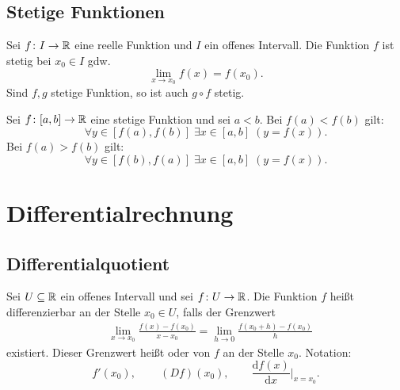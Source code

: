 \subsection{Stetige Funktionen}
Sei $f\colon I\to\mathbb R$ eine reelle Funktion und $I$ ein offenes
Intervall. Die Funktion $f$ ist stetig bei $x_0\in I$ gdw.
\begin{equation}
\lim_{x\to x_0} f(x)=f(x_0).
\end{equation}
Sind $f,g$ stetige Funktion, so ist auch $g\circ f$ stetig.

\noindent
{}
Sei $f\colon [a,b]\to\mathbb R$ eine stetige Funktion und sei
$a<b$. Bei $f(a)<f(b)$ gilt:
\begin{equation}
\forall y{\in}[f(a),f(b)]\;\exists x{\in}[a,b]\;(y=f(x)).
\end{equation}
Bei $f(a)>f(b)$ gilt:
\begin{equation}
\forall y{\in}[f(b),f(a)]\;\exists x{\in}[a,b]\;(y=f(x)).
\end{equation}

\newpage
\section{Differentialrechnung}
\subsection{Differentialquotient}
\begin{definition}[Differentialquotient]\mbox{}\newline
Sei $U\subseteq\mathbb R$ ein offenes Intervall
und sei $f\colon U\to\mathbb R$. Die Funktion $f$ heißt
differenzierbar
an der Stelle $x_0\in U$, falls der Grenzwert
\begin{equation}
\begin{split}
&\lim_{x\to x_0} \frac{f(x)-f(x_0)}{x-x_0}
= \lim_{h\to 0}\frac{f(x_0+h)-f(x_0)}{h}
\end{split}
\end{equation}
existiert. Dieser Grenzwert heißt
 oder 
von $f$ an der Stelle $x_0$. Notation:
\begin{equation}
f'(x_0),\,\qquad (Df)(x_0),\qquad \frac{\mathrm df(x)}{\mathrm dx}\Big|_{x=x_0}.
\end{equation}
\end{definition}

